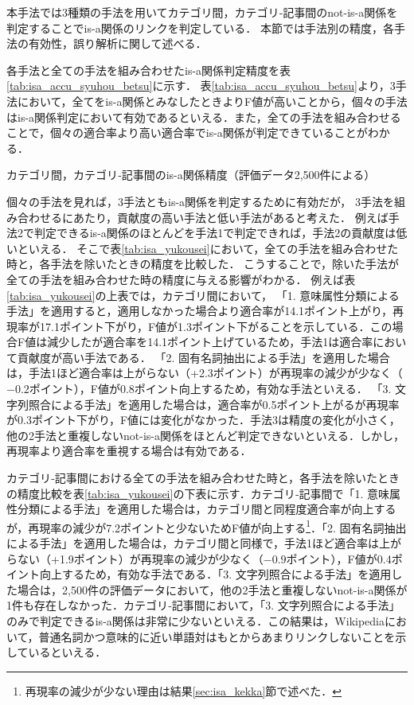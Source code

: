 \documentclass[japanese]{jnlp_1.4}
\begin{document}
本手法では3種類の手法を用いてカテゴリ間，カテゴリ‐記事間のnot-is-a関係を判定することでis-a関係のリンクを判定している．
本節では手法別の精度，各手法の有効性，誤り解析に関して述べる．

各手法と全ての手法を組み合わせたis-a関係判定精度を表\ref{tab:isa_accu_syuhou_betsu}に示す．
表\ref{tab:isa_accu_syuhou_betsu}より，3手法において，全てをis-a関係とみなしたときよりF値が高いことから，個々の手法はis-a関係判定において有効であるといえる．また，全ての手法を組み合わせることで，個々の適合率より高い適合率でis-a関係が判定できていることがわかる．

\begin{table}[t]
\caption{カテゴリ間，カテゴリ‐記事間のis-a関係精度（評価データ2,500件による）}
\label{tab:isa_accu_syuhou_betsu}

\end{table}
\begin{table}[t]
\label{tab:isa_yukousei}

\end{table}


個々の手法を見れば，3手法ともis-a関係を判定するために有効だが，
3手法を組み合わせるにあたり，貢献度の高い手法と低い手法があると考えた．
例えば手法2で判定できるis-a関係のほとんどを手法1で判定できれば，手法2の貢献度は低いといえる．
そこで表\ref{tab:isa_yukousei}において，全ての手法を組み合わせた時と，各手法を除いたときの精度を比較した．
こうすることで，除いた手法が全ての手法を組み合わせた時の精度に与える影響がわかる．
例えば表\ref{tab:isa_yukousei}の上表では，カテゴリ間において，
「1. 意味属性分類による手法」を適用すると，適用しなかった場合より適合率が14.1ポイント上がり，再現率が17.1ポイント下がり，F値が1.3ポイント下がることを示している．この場合F値は減少したが適合率を14.1ポイント上げているため，手法1は適合率において貢献度が高い手法である．
「2. 固有名詞抽出による手法」を適用した場合は，手法1ほど適合率は上がらない（+2.3ポイント）が再現率の減少が少なく（$-0.2$ポイント），F値が0.8ポイント向上するため，有効な手法といえる．
「3. 文字列照合による手法」を適用した場合は，適合率が0.5ポイント上がるが再現率が0.3ポイント下がり，F値には変化がなかった．手法3は精度の変化が小さく，他の2手法と重複しないnot-is-a関係をほとんど判定できないといえる．しかし，
再現率より適合率を重視する場合は有効である．

カテゴリ‐記事間における全ての手法を組み合わせた時と，各手法を除いたときの精度比較を表\ref{tab:isa_yukousei}の下表に示す．カテゴリ‐記事間で「1. 意味属性分類による手法」を適用した場合は，カテゴリ間と同程度適合率が向上するが，再現率の減少が7.2ポイントと少ないためF値が向上する\footnote{再現率の減少が少ない理由は結果\ref{sec:isa_kekka}節で述べた．}．「2. 固有名詞抽出による手法」を適用した場合は，カテゴリ間と同様で，手法1ほど適合率は上がらない（+1.9ポイント）が再現率の減少が少なく（$-0.9$ポイント），F値が0.4ポイント向上するため，有効な手法である．「3. 文字列照合による手法」を適用した場合は，2,500件の評価データにおいて，他の2手法と重複しないnot-is-a関係が1件も存在しなかった．カテゴリ‐記事間において，「3. 文字列照合による手法」のみで判定できるis-a関係は非常に少ないといえる．この結果は，Wikipediaにおいて，普通名詞かつ意味的に近い単語対はもとからあまりリンクしないことを示しているといえる．
\end{document}
